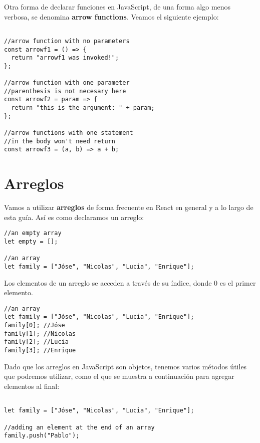 \documentclass[a4paper, oneside, titlepage, 12pt]{book}
\begin{document}
Otra forma de declarar funciones en JavaScript, de una forma algo menos verbosa, se denomina \textbf{arrow functions}. Veamos el siguiente ejemplo:

\begin{verbatim}
               
//arrow function with no parameters
const arrowf1 = () => {
  return "arrowf1 was invoked!";
};

//arrow function with one parameter
//parenthesis is not necesary here
const arrowf2 = param => {
  return "this is the argument: " + param;
};

//arrow functions with one statement 
//in the body won't need return 
const arrowf3 = (a, b) => a + b;
\end{verbatim}

\section{Arreglos} \label{arrays}

Vamos a utilizar \textbf{arreglos} de forma frecuente en React en general y a lo largo de esta guía. Así es como declaramos un arreglo:

\begin{verbatim}
//an empty array
let empty = [];

//an array
let family = ["Jóse", "Nicolas", "Lucia", "Enrique"];
\end{verbatim}

Los elementos de un arreglo se acceden a través de su índice, donde 0 es el primer elemento.

\begin{verbatim}
//an array
let family = ["Jóse", "Nicolas", "Lucia", "Enrique"];
family[0]; //Jóse
family[1]; //Nicolas
family[2]; //Lucia
family[3]; //Enrique
\end{verbatim}

Dado que los arreglos en JavaScript son objetos, tenemos varios métodos útiles que podremos utilizar, como el que se muestra a continuación para agregar elementos al final:

\begin{verbatim}

let family = ["Jóse", "Nicolas", "Lucia", "Enrique"];

//adding an element at the end of an array
family.push("Pablo");
\end{verbatim}
\end{document}
